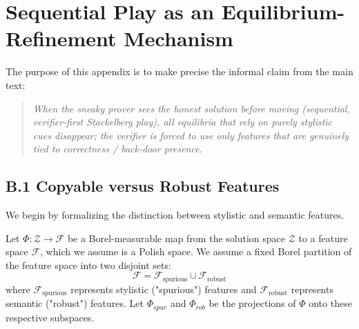 \renewcommand{\thesection}{B}
\renewcommand{\thedefinition}{B.\arabic{definition}}
\renewcommand{\thelemma}{B.\arabic{lemma}}
\renewcommand{\thetheorem}{B.\arabic{theorem}}
\setcounter{definition}{0}
\setcounter{lemma}{0}
\setcounter{theorem}{0}

\section*{Sequential Play as an Equilibrium-Refinement Mechanism}

The purpose of this appendix is to make precise the informal claim from
the main text:

\begin{quote}
\emph{When the sneaky prover sees the honest solution before moving
(sequential, verifier-first Stackelberg play), all equilibria that rely
on purely stylistic cues disappear; the verifier is forced to use only
features that are genuinely tied to correctness / back-door presence.}
\end{quote}

\subsection*{B.1 Copyable versus Robust Features}

We begin by formalizing the distinction between stylistic and semantic features.

\begin{definition}\label{def:B.feature}
Let $\Phi: \mathcal{Z} \to \mathcal{F}$ be a Borel-measurable map from the solution space $\mathcal{Z}$ to a feature space $\mathcal{F}$, which we assume is a Polish space. We assume a fixed Borel partition of the feature space into two disjoint sets:
\[
  \mathcal{F} = \mathcal{F}_{\mathrm{spurious}} \cup \mathcal{F}_{\mathrm{robust}}
\]
where $\mathcal{F}_{\mathrm{spurious}}$ represents stylistic ("spurious") features and $\mathcal{F}_{\mathrm{robust}}$ represents semantic ("robust") features. Let $\Phi_{spur}$ and $\Phi_{rob}$ be the projections of $\Phi$ onto these respective subspaces.
\end{definition}

